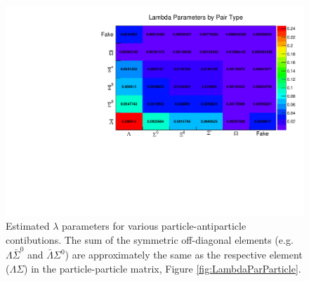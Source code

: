 \begin{figure}[hbtp]
\includegraphics[width=36pc]{Figures/YieldAndEff/2016-08-12-LambdaParamsParticleAntiparticle.pdf}
\caption[Particle-antiparticle $\lambda$ parameters]{
Estimated $\lambda$ parameters for various particle-antiparticle contibutions. The sum of the symmetric off-diagonal elements (e.g.\ $\Lambda\bar{\Sigma}^0$ and $\bar{\Lambda}\Sigma^0$) are approximately the same as the respective element ($\Lambda\Sigma$) in the particle-particle matrix, Figure \ref{fig:LambdaParParticle}.
}
\label{fig:LambdaParParticleAntiparticle}
\end{figure}

